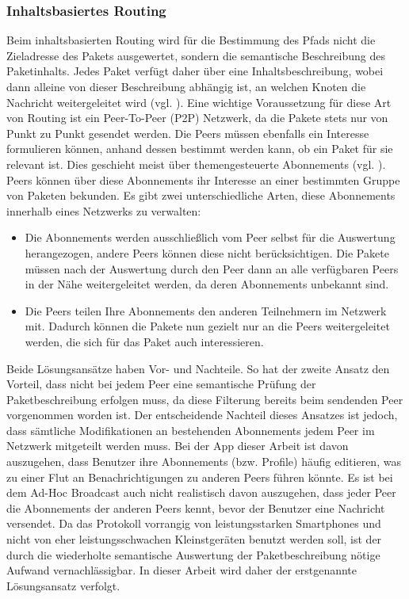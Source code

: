 \subsubsection{Inhaltsbasiertes Routing}
Beim inhaltsbasierten Routing wird für die Bestimmung des Pfads nicht die Zieladresse des Pakets ausgewertet, sondern die semantische Beschreibung des Paketinhalts. Jedes Paket verfügt daher über eine Inhaltsbeschreibung, wobei dann alleine von dieser Beschreibung abhängig ist, an welchen Knoten die Nachricht weitergeleitet wird (vgl. \citet[S. 649]{Tanenbaum2007}). Eine wichtige Voraussetzung für diese Art von Routing ist ein Peer-To-Peer (P2P) Netzwerk, da die Pakete stets nur von Punkt zu Punkt gesendet werden. Die Peers müssen ebenfalls ein Interesse formulieren können, anhand dessen bestimmt werden kann, ob ein Paket für sie relevant ist. Dies geschieht meist über themengesteuerte Abonnements (vgl. \citet[S. 650f]{Tanenbaum2007}). Peers können über diese Abonnements ihr Interesse an einer bestimmten Gruppe von Paketen bekunden. Es gibt zwei unterschiedliche Arten, diese Abonnements innerhalb eines Netzwerks zu verwalten:
\begin{itemize}
	\item Die Abonnements werden ausschließlich vom Peer selbst für die Auswertung herangezogen, andere Peers können diese nicht berücksichtigen. Die Pakete müssen nach der Auswertung durch den Peer dann an alle verfügbaren Peers in der Nähe weitergeleitet werden, da deren Abonnements unbekannt sind. 
	\item Die Peers teilen Ihre Abonnements den anderen Teilnehmern im Netzwerk mit. Dadurch können die Pakete nun gezielt nur an die Peers weitergeleitet werden, die sich für das Paket auch interessieren.
\end{itemize}
Beide Lösungsansätze haben Vor- und Nachteile. So hat der zweite Ansatz den Vorteil, dass nicht bei jedem Peer eine semantische Prüfung der Paketbeschreibung erfolgen muss, da diese Filterung bereits beim sendenden Peer vorgenommen worden ist. Der entscheidende Nachteil dieses Ansatzes ist jedoch, dass sämtliche Modifikationen an bestehenden Abonnements jedem Peer im Netzwerk mitgeteilt werden muss. Bei der App dieser Arbeit ist davon auszugehen, dass Benutzer ihre Abonnements (bzw. Profile) häufig editieren, was zu einer Flut an Benachrichtigungen zu anderen Peers führen könnte. Es ist bei dem Ad-Hoc Broadcast auch nicht realistisch davon auszugehen, dass jeder Peer die Abonnements der anderen Peers kennt, bevor der Benutzer eine Nachricht versendet. Da das Protokoll vorrangig von leistungsstarken Smartphones und nicht von eher leistungsschwachen Kleinstgeräten benutzt werden soll, ist der durch die wiederholte semantische Auswertung der Paketbeschreibung nötige Aufwand vernachlässigbar. In dieser Arbeit wird daher der erstgenannte Lösungsansatz verfolgt. 
